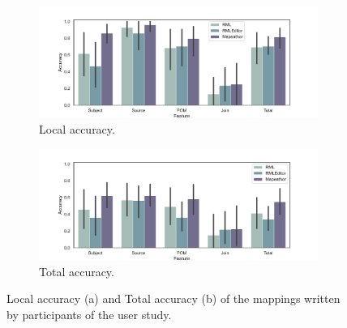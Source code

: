 \begin{figure}[t!]
    \centering
    \begin{subfigure}[b]{\linewidth}
    	\includegraphics[width=\linewidth]{figures/chp5-1_rel-acc.pdf}
    	\caption{Local accuracy.}
    	\label{fig:chp5_mapeathor_relacc}
    \end{subfigure}
    \begin{subfigure}[b]{\linewidth}
    	\includegraphics[width=\linewidth]{figures/chp5-1_total-acc.pdf}
    	\caption{Total accuracy.}
    	\label{fig:chp5_mapeathor_totacc}
    \end{subfigure}
    \caption[Accuracy results of user study]{Local accuracy (a) and Total accuracy (b) of the mappings written by participants of the user study.}
    \label{fig:chp5-1_accuracy}
\end{figure}



